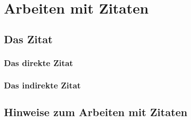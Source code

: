 \chapter				{Arbeiten mit Zitaten}											
	\section			{Das Zitat}														
		\subsection		{Das direkte Zitat}												
		\subsection		{Das indirekte Zitat}											
	\section			{Hinweise zum Arbeiten mit Zitaten}								
		
